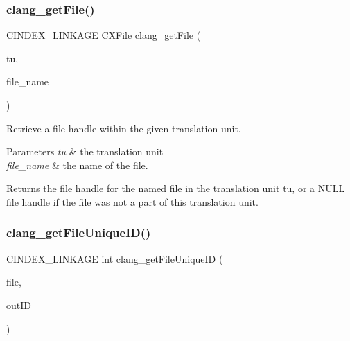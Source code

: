 \subsubsection{\texorpdfstring{clang\+\_\+get\+File()}{clang\_getFile()}}
{\footnotesize\ttfamily C\+I\+N\+D\+E\+X\+\_\+\+L\+I\+N\+K\+A\+GE \hyperlink{group__CINDEX__FILES_gacfcea9c1239c916597e2e5b3e109215a}{C\+X\+File} clang\+\_\+get\+File (\begin{DoxyParamCaption}\item[{\hyperlink{group__CINDEX_gacdb7815736ca709ce9a5e1ec2b7e16ac}{C\+X\+Translation\+Unit}}]{tu,  }\item[{const char $\ast$}]{file\+\_\+name }\end{DoxyParamCaption})}



Retrieve a file handle within the given translation unit. 


\begin{DoxyParams}{Parameters}
{\em tu} & the translation unit\\
\hline
{\em file\+\_\+name} & the name of the file.\\
\hline
\end{DoxyParams}
\begin{DoxyReturn}{Returns}
the file handle for the named file in the translation unit {\ttfamily tu}, or a N\+U\+LL file handle if the file was not a part of this translation unit. 
\end{DoxyReturn}
\mbox{\label{group__CINDEX__FILES_gafeef0a8288de8c14e95e4d6c249aaf1e}} 
\subsubsection{\texorpdfstring{clang\+\_\+get\+File\+Unique\+I\+D()}{clang\_getFileUniqueID()}}
{\footnotesize\ttfamily C\+I\+N\+D\+E\+X\+\_\+\+L\+I\+N\+K\+A\+GE int clang\+\_\+get\+File\+Unique\+ID (\begin{DoxyParamCaption}\item[{\hyperlink{group__CINDEX__FILES_gacfcea9c1239c916597e2e5b3e109215a}{C\+X\+File}}]{file,  }\item[{\hyperlink{structCXFileUniqueID}{C\+X\+File\+Unique\+ID} $\ast$}]{out\+ID }\end{DoxyParamCaption})}




